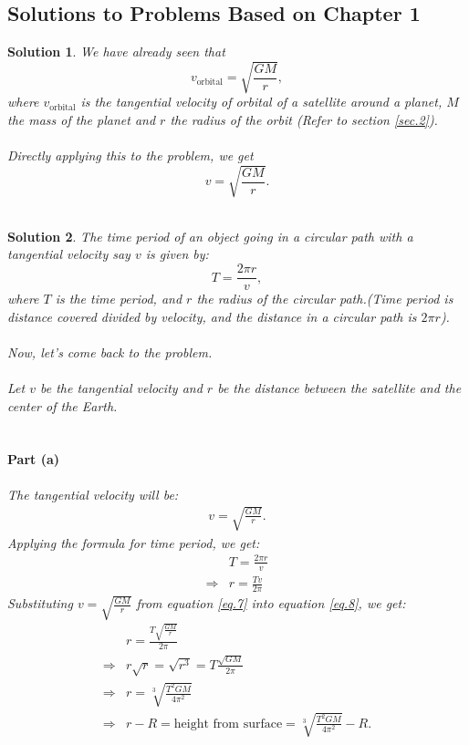 \documentclass[a4paper]{report}
\newtheorem{solution}{Solution}
\begin{document}
\subsection{Solutions to Problems Based on Chapter 1}
\begin{solution} \normalfont
We have already seen that $$v_{\text{orbital}}=\sqrt{\frac{GM}{r}},$$ where 
$v_{\text{orbital}}$ is the tangential velocity of orbital of a satellite around a planet, $M$ the mass of the 
planet and $r$ the radius of the orbit (Refer to section \ref{sec.2}). \\\\
Directly applying this to the problem, we get $$\boxed{v=\sqrt{\frac{GM}{r}}}.$$\\
\end{solution}
\begin{solution} \label{sol.1}\normalfont
The time period of an object going in a circular path with a tangential velocity say $v$
is given by: $$T=\frac{2\pi r}{v},$$ where $T$ is the time period, and $r$ the radius of the circular path.(Time
period is distance covered divided by velocity, and the distance in a circular path is $2\pi r$).\\\\
Now, let's come back to the problem.\\\\ 
Let $v$ be the tangential velocity and $r$ be the distance between the 
satellite and the center of the Earth.\\\\
\paragraph*{Part (a)} 
The tangential velocity will be: 
\begin{align}\label{eq.7}
  {v=\sqrt{\frac{GM}{r}}}.
\end{align}
Applying the formula for time period, we get: 
\begin{equation}\label{eq.8}
  \begin{split}
    &T=\frac{2\pi r}{v}\\
    \Rightarrow & r=\frac{Tv}{2\pi}
  \end{split}
\end{equation}
Substituting $v=\sqrt{\frac{GM}{r}}$ from equation \ref{eq.7} into equation \ref{eq.8}, we get: 
\begin{equation}\label{eq.9}
\begin{split}
  &r=\frac{T\sqrt{\frac{GM}{r}}}{2\pi}\\
  \Rightarrow &r\sqrt{r}=\sqrt{r^3}={T\frac{\sqrt{GM}}{2\pi}}\\
  \Rightarrow & r=\sqrt[3]{\frac{T^2GM}{4\pi^2}}\\
  \Rightarrow & r-R=\text{height from surface}=\boxed{\sqrt[3]{\frac{T^2GM}{4\pi^2}}-R}.
\end{split}
\end{equation}
\\

\end{solution}
\end{document}
